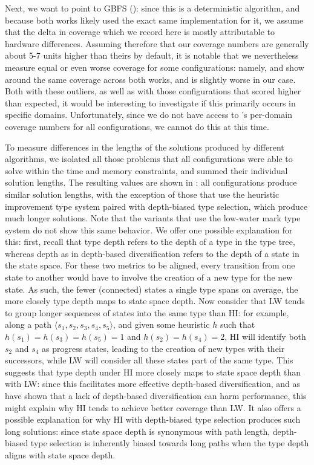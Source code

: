 Next, we want to point to GBFS (): since this is a deterministic algorithm, and because both works likely used the exact same implementation for it, we assume that the delta in coverage which we record here is mostly attributable to hardware differences. Assuming therefore that our coverage numbers are generally about 5-7 units higher than theirs by default, it is notable that we nevertheless measure equal or even worse coverage for some configurations: namely, \hgHu and \hiUu show around the same coverage across both works, and \hgUu is slightly worse in our case. Both with these outliers, as well as with those configurations that scored higher than expected, it would be interesting to investigate if this primarily occurs in specific domains. Unfortunately, since we do not have access to 's per-domain coverage numbers for all configurations, we cannot do this at this time.

To measure differences in the lengths of the solutions produced by different algorithms, we isolated all those problems that all configurations were able to solve within the time and memory constraints, and summed their individual solution lengths. The resulting values are shown in : all configurations produce similar solution lengths, with the exception of those that use the heuristic improvement type system paired with depth-biased type selection, which produce much longer solutions. Note that the variants that use the low-water mark type system do not show this same behavior. We offer one possible explanation for this: first, recall that type depth refers to the depth of a type in the type tree, whereas depth as in depth-based diversification refers to the depth of a state in the state space. For these two metrics to be aligned, every transition from one state to another would have to involve the creation of a new type for the new state. As such, the fewer (connected) states a single type spans on average, the more closely type depth maps to state space depth. Now consider that LW tends to group longer sequences of states into the same type than HI: for example, along a path $\langle s_1,s_2,s_3,s_4,s_5\rangle$, and given some heuristic $h$ such that $h(s_1)=h(s_3)=h(s_5)=1$ and $h(s_2)=h(s_4)=2$, HI will identify both $s_2$ and $s_4$ as progress states, leading to the creation of new types with their successors, while LW will consider all these states part of the same type. This suggests that type depth under HI more closely maps to state space depth than with LW: since this facilitates more effective depth-based diversification, and as  have shown that a lack of depth-based diversification can harm performance, this might explain why HI tends to achieve better coverage than LW. It also offers a possible explanation for why HI with depth-biased type selection produces such long solutions: since state space depth is synonymous with path length, depth-biased type selection is inherently biased towards long paths when the type depth aligns with state space depth.

